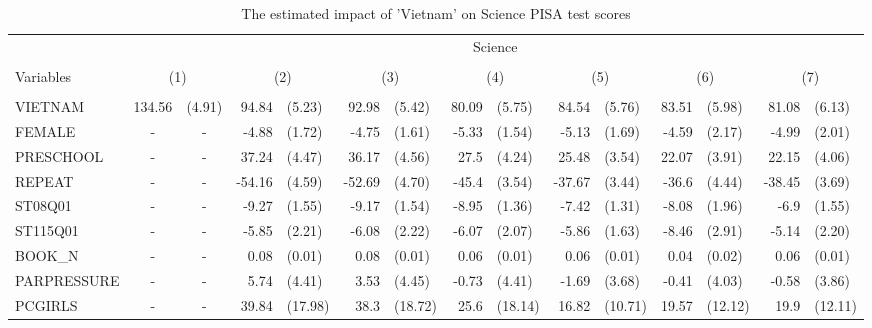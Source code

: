 \documentclass[12pt]{article}%
\begin{document}
	\begin{table}[H]
		\tiny
		\def\arraystretch{1}
		\def\tabcolsep{4}
		\centering
		\caption{The estimated impact of 'Vietnam' on Science PISA test scores}
		\begin{tabular}{lrlrlrlrlrlrlrl}
			\toprule
			\midrule
			& \multicolumn{14}{c}{Science} \\
			\cline{2-15} \\
			Variables & \multicolumn{2}{c}{(1)} & \multicolumn{2}{c}{(2)} & \multicolumn{2}{c}{(3)} & \multicolumn{2}{c}{(4)} & \multicolumn{2}{c}{(5)} & \multicolumn{2}{c}{(6)} & \multicolumn{2}{c}{(7)} \\
			\hline\\ 
			
			VIETNAM & 134.56 & (4.91) & 94.84 & (5.23) & 92.98 & (5.42) & 80.09 & (5.75) & 84.54 & (5.76) & 83.51 & (5.98) & 81.08 & (6.13) \\[0.2em]
			FEMALE & \multicolumn{1}{c}{-} & \multicolumn{1}{c}{-} & -4.88 & (1.72) & -4.75 & (1.61) & -5.33 & (1.54) & -5.13 & (1.69) & -4.59 & (2.17) & -4.99 & (2.01) \\[0.2em]
			PRESCHOOL & \multicolumn{1}{c}{-} & \multicolumn{1}{c}{-} & 37.24 & (4.47) & 36.17 & (4.56) & 27.5  & (4.24) & 25.48 & (3.54) & 22.07 & (3.91) & 22.15 & (4.06) \\[0.2em]
			REPEAT & \multicolumn{1}{c}{-} & \multicolumn{1}{c}{-} & -54.16 & (4.59) & -52.69 & (4.70) & -45.4 & (3.54) & -37.67 & (3.44) & -36.6 & (4.44) & -38.45 & (3.69) \\[0.2em]
			ST08Q01 & \multicolumn{1}{c}{-} & \multicolumn{1}{c}{-} & -9.27 & (1.55) & -9.17 & (1.54) & -8.95 & (1.36) & -7.42 & (1.31) & -8.08 & (1.96) & -6.9  & (1.55) \\[0.2em]
			ST115Q01 & \multicolumn{1}{c}{-} & \multicolumn{1}{c}{-} & -5.85 & (2.21) & -6.08 & (2.22) & -6.07 & (2.07) & -5.86 & (1.63) & -8.46 & (2.91) & -5.14 & (2.20) \\[0.2em]
			BOOK\_N & \multicolumn{1}{c}{-} & \multicolumn{1}{c}{-} & 0.08  & (0.01) & 0.08  & (0.01) & 0.06  & (0.01) & 0.06  & (0.01) & 0.04  & (0.02) & 0.06  & (0.01) \\[0.2em]
			PARPRESSURE & \multicolumn{1}{c}{-} & \multicolumn{1}{c}{-} & 5.74  & (4.41) & 3.53  & (4.45) & -0.73 & (4.41) & -1.69 & (3.68) & -0.41 & (4.03) & -0.58 & (3.86) \\[0.2em]
			PCGIRLS & \multicolumn{1}{c}{-} & \multicolumn{1}{c}{-} & 39.84 & (17.98) & 38.3  & (18.72) & 25.6  & (18.14) & 16.82 & (10.71) & 19.57 & (12.12) & 19.9  & (12.11) \\[0.2em]

\end{tabular}
\end{table}
\end{document}
